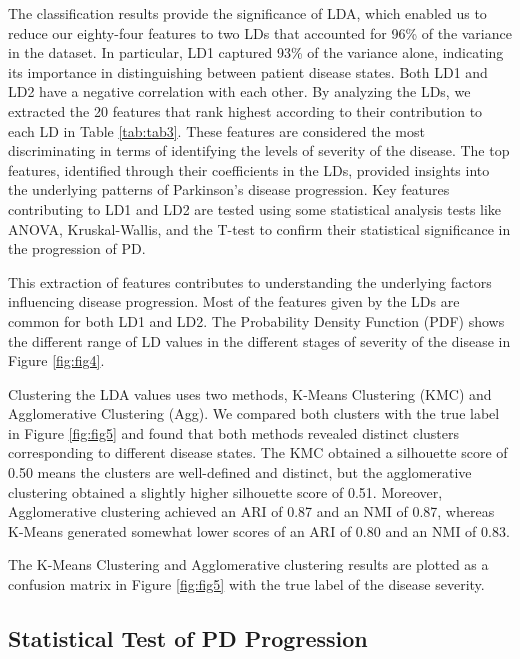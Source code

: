\documentclass[twocolumn]{article}
\begin{document}
The classification results provide the significance of LDA, which enabled us to reduce our eighty-four features to two LDs that accounted for 96\% of the variance in the dataset. In particular, LD1 captured 93\% of the variance alone, indicating its importance in distinguishing between patient disease states. Both LD1 and LD2 have a negative correlation with each other. By analyzing the LDs, we extracted the 20 features that rank highest according to their contribution to each LD in Table \ref{tab:tab3}. These features are considered the most discriminating in terms of identifying the levels of severity of the disease. The top features, identified through their coefficients in the LDs, provided insights into the underlying patterns of Parkinson's disease progression. Key features contributing to LD1 and LD2 are tested using some statistical analysis tests like ANOVA, Kruskal-Wallis, and the T-test to confirm their statistical significance in the progression of PD.

This extraction of features contributes to understanding the underlying factors influencing disease progression. Most of the features given by the LDs are common for both LD1 and LD2. The Probability Density Function (PDF) shows the different range of LD values in the different stages of severity of the disease in Figure \ref{fig:fig4}. 




Clustering the LDA values uses two methods, K-Means Clustering (KMC) and Agglomerative Clustering (Agg). We compared both clusters with the true label in Figure \ref{fig:fig5} and found that both methods revealed distinct clusters corresponding to different disease states. The KMC obtained a silhouette score of 0.50 means the clusters are well-defined and distinct, but the agglomerative clustering obtained a slightly higher silhouette score of 0.51. Moreover, Agglomerative clustering achieved an ARI of 0.87 and an NMI of 0.87, whereas K-Means generated somewhat lower scores of an ARI of 0.80 and an NMI of 0.83.

The K-Means Clustering and Agglomerative clustering results are plotted as a confusion matrix in Figure \ref{fig:fig5} with the true label of the disease severity.


\subsection{Statistical Test of PD Progression}
\label{PD Progression Result}
\end{document}
